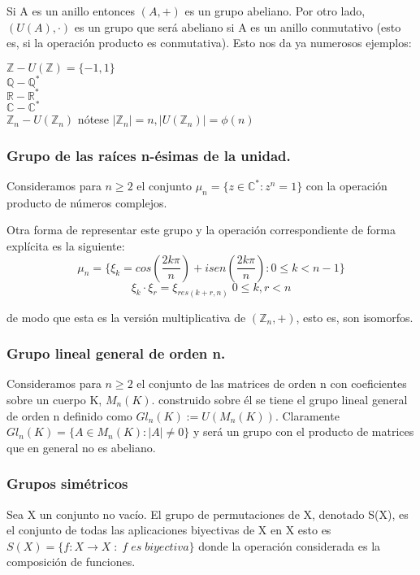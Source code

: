 Si A es un anillo entonces $(A,+)$ es un grupo abeliano. Por otro lado, $(U(A),\cdot)$ es un grupo que será abeliano si A es un anillo conmutativo (esto es, si la operación producto es conmutativa). Esto nos da ya numerosos ejemplos:

$\mathbb{Z}-U(\mathbb{Z})=\{-1,1\}$ \\
$\mathbb{Q}-\mathbb{Q}^{*}$ \\
$\mathbb{R}-\mathbb{R}^{*}$ \\
$\mathbb{C}-\mathbb{C}^{*}$ \\
$\mathbb{Z}_n-U(\mathbb{Z}_n)$ nótese $|\mathbb{Z}_n| = n,|U(\mathbb{Z}_n)| = \phi(n)$ 

\subsubsection{Grupo de las raíces n-ésimas de la unidad.}

Consideramos para $n \ge 2$ el conjunto $\mu_n = \{z \in \mathbb{C}^{*} : z^n = 1\}$ con la operación producto de números complejos. 

Otra forma de representar este grupo y la operación correspondiente de forma explícita es la siguiente:
$$\mu_n = \{\xi_k = cos(\frac{2k\pi}{n})+isen(\frac{2k\pi}{n}) : 0 \le k < n-1 \}$$
$$\xi_k \cdot \xi_r = \xi_{res(k+r,n)} \; 0 \le k,r < n$$

de modo que esta es la versión multiplicativa de $(\mathbb{Z}_n,+)$, esto es, son isomorfos.

\subsubsection{Grupo lineal general de orden n.}

Consideramos para $n \ge 2$ el conjunto de las matrices de orden n con coeficientes sobre un cuerpo K, $M_n(K)$. construido sobre él se tiene el grupo lineal general de orden n definido como $Gl_n(K) := U(M_n(K))$. Claramente $Gl_n(K) = \{A \in M_n(K) : |A| \neq 0\}$ y será un grupo con el producto de matrices que en general no es abeliano.

\subsubsection{Grupos simétricos}

Sea X un conjunto no vacío. El grupo de permutaciones de X, denotado S(X), es el conjunto de todas las aplicaciones biyectivas de X en X esto es $S(X) = \{f:X \rightarrow X \; : \; f \; es \; biyectiva\}$ donde la operación considerada es la composición de funciones.

